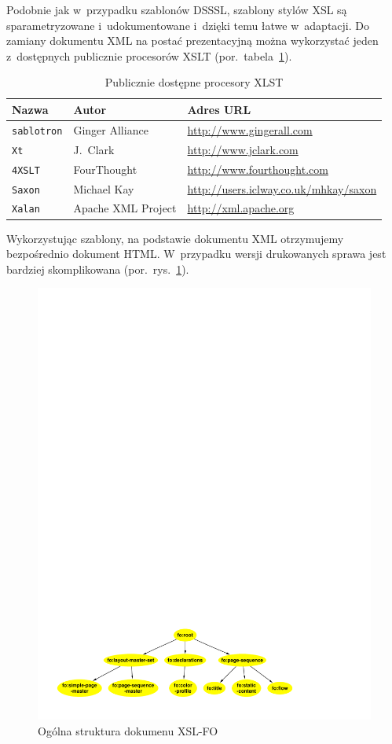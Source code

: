 \documentclass[skorowidz,brudnopis,xodstep]{xmgr}
\begin{document}
Podobnie jak w~przypadku szablonów DSSSL, szablony stylów XSL są
sparametryzowane i~udokumentowane i~dzięki temu łatwe w~adaptacji. Do
zamiany dokumentu XML na postać prezentacyjną można wykorzystać jeden
z~dostępnych publicznie procesorów XSLT
(por.~tabela~\ref{zest:proces:xslt}).

\begin{table}[!htb]
\begin{tabular}{|l|l|l|} \hline
Nazwa & Autor      & Adres URL \\ \hline
\texttt{sablotron} & Ginger Alliance & \url{http://www.gingerall.com} \\ \hline
\texttt{Xt}        & J.~Clark & \url{http://www.jclark.com} \\ \hline
\texttt{4XSLT}     & FourThought & \url{http://www.fourthought.com} \\ \hline
\texttt{Saxon}     & Michael Kay &  \url{http://users.iclway.co.uk/mhkay/saxon} \\ \hline
\texttt{Xalan}     & Apache XML Project & \url{http://xml.apache.org} \\ \hline
\end{tabular}
\caption{Publicznie dostępne procesory XLST\label{zest:proces:xslt}}
\end{table}

Wykorzystując szablony, na podstawie dokumentu XML otrzymujemy
bezpośrednio dokument HTML. W~przypadku wersji drukowanych sprawa jest
bardziej skomplikowana (por.~rys.~\ref{fig:xsl-fo}).

\begin{figure}[!tbh]
\centering 
\includegraphics[width=.8\hsize]{fo-structure}
\caption{Ogólna struktura dokumenu XSL-FO\label{fig:xsl-fo}}
\end{figure}
\end{document}
